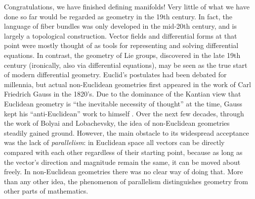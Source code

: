 
\begin{hrem*}
    \small
    Congratulations, we have finished defining manifolds! Very little of what we have done so far would be regarded as geometry in the 19th century. In fact, the language of fiber bundles was only developed in the mid-20th century, and is largely a topological construction. Vector fields and differential forms at that point were mostly thought of as tools for representing and solving differential equations. In contrast, the geometry of Lie groups, discovered in the late 19th century (ironically, also via differential equations), may be seen as the true start of modern differential geometry. Euclid's postulates had been debated for millennia, but actual non-Euclidean geometries first appeared in the work of Carl Friedrich Gauss in the 1820's. Due to the dominance of the Kantian view that Euclidean geometry is ``the inevitable necessity of thought'' at the time, Gauss kept his ``anti-Euclidean'' work to himself \cite{Freeman}. Over the next few decades, through the work of Bolyai and Lobachevsky, the idea of non-Euclidean geometries steadily gained ground. However, the main obstacle to its widespread acceptance was the lack of \emph{parallelism}: in Euclidean space all vectors can be directly compared with each other regardless of their starting point, because as long as the vector's direction and magnitude remain the same, it can be moved about freely. In non-Euclidean geometries there was no clear way of doing that. More than any other idea, the phenomenon of parallelism distinguishes geometry from other parts of mathematics.
    

\end{hrem*}
